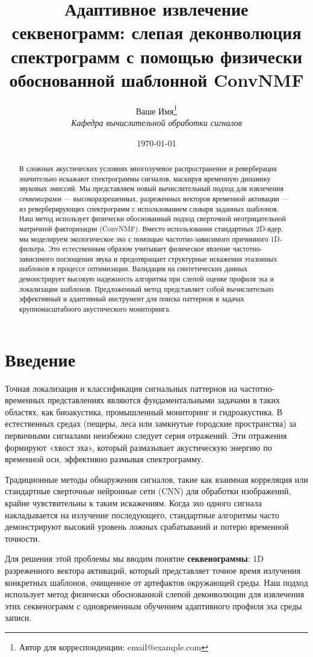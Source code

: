 \documentclass[11pt,a4paper]{article}
\title{\textbf{Адаптивное извлечение секвенограмм: слепая деконволюция спектрограмм с помощью физически обоснованной шаблонной ConvNMF}}
\author{Ваше Имя\thanks{Автор для корреспонденции: email@example.com} \\ 
        \small \textit{Кафедра вычислительной обработки сигналов}}
\date{\today}
\begin{document}
\maketitle

\begin{abstract}
В сложных акустических условиях многолучевое распространение и реверберация значительно искажают спектрограммы сигналов, маскируя временную динамику звуковых эмиссий. Мы представляем новый вычислительный подход для извлечения \textit{секвенограмм} — высокоразрешенных, разреженных векторов временной активации — из реверберирующих спектрограмм с использованием словаря заданных шаблонов. Наш метод использует физически обоснованный подход сверточной неотрицательной матричной факторизации (ConvNMF). Вместо использования стандартных 2D-ядер, мы моделируем экологическое эхо с помощью частотно-зависимого причинного 1D-фильтра. Это естественным образом учитывает физическое явление частотно-зависимого поглощения звука и предотвращает структурные искажения эталонных шаблонов в процессе оптимизации. Валидация на синтетических данных демонстрирует высокую надежность алгоритма при слепой оценке профиля эха и локализации шаблонов. Предложенный метод представляет собой вычислительно эффективный и адаптивный инструмент для поиска паттернов в задачах крупномасштабного акустического мониторинга.
\end{abstract}

\section{Введение}
Точная локализация и классификация сигнальных паттернов на частотно-временных представлениях являются фундаментальными задачами в таких областях, как биоакустика, промышленный мониторинг и гидроакустика. В естественных средах (пещеры, леса или замкнутые городские пространства) за первичными сигналами неизбежно следует серия отражений. Эти отражения формируют «хвост эха», который размазывает акустическую энергию по временной оси, эффективно размывая спектрограмму.

Традиционные методы обнаружения сигналов, такие как взаимная корреляция или стандартные сверточные нейронные сети (CNN) для обработки изображений, крайне чувствительны к таким искажениям. Когда эхо одного сигнала накладывается на излучение последующего, стандартные алгоритмы часто демонстрируют высокий уровень ложных срабатываний и потерю временной точности.

Для решения этой проблемы мы вводим понятие \textbf{секвенограммы}: 1D разреженного вектора активаций, который представляет точное время излучения конкретных шаблонов, очищенное от артефактов окружающей среды. Наш подход использует метод физически обоснованной слепой деконволюции для извлечения этих секвенограмм с одновременным обучением адаптивного профиля эха среды записи.
\end{document}
